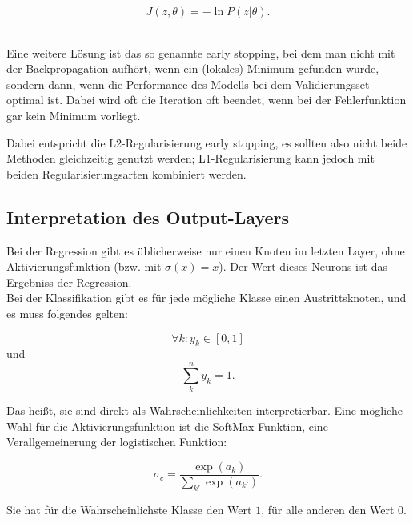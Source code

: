 \begin{equation}
	J(z, \theta) = - \ln P (z | \theta).
\end{equation}

\cite{bengio2012practical} \\
Eine weitere Lösung ist das so genannte early stopping, bei dem man nicht mit der Backpropagation aufhört, wenn ein (lokales) Minimum gefunden wurde, sondern dann, wenn die Performance des Modells bei dem Validierungsset optimal ist. Dabei wird oft die Iteration oft beendet, wenn bei der Fehlerfunktion gar kein Minimum vorliegt.  

Dabei entspricht die L2-Regularisierung early stopping, es sollten also nicht beide Methoden gleichzeitig genutzt werden; L1-Regularisierung kann jedoch mit beiden Regularisierungsarten kombiniert werden. \cite{bengio2012practical}

\subsection{Interpretation des Output-Layers}
Bei der Regression gibt es üblicherweise nur einen Knoten im letzten Layer, ohne Aktivierungsfunktion (bzw. mit $\sigma(x) = x$). Der Wert dieses Neurons ist das Ergebniss der Regression. \\

Bei der Klassifikation gibt es für jede mögliche Klasse einen Austrittsknoten, und es muss folgendes gelten:

\begin{equation}
 	\forall	k: y_k \in [0,1]
 \end{equation} 
 und 
 \begin{equation}
 	\sum_k^n y_k = 1.
 \end{equation}

Das heißt, sie sind direkt als Wahrscheinlichkeiten interpretierbar. Eine mögliche Wahl für die Aktivierungsfunktion ist die SoftMax-Funktion, eine Verallgemeinerung der logistischen Funktion:

\begin{equation}
	\sigma_c = \frac{\exp (a_k)}{\sum_{k'} \exp (a_{k'})}.
\end{equation}

Sie hat für die Wahrscheinlichste Klasse den Wert $1$, für alle anderen den Wert $0$. \cite{bishop1995neural}



